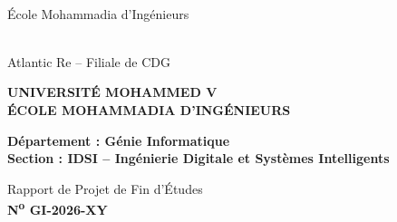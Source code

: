 \documentclass[12pt,a4paper]{report}
\begin{document}

\setcounter{page}{1}

\begin{titlepage}
\thispagestyle{empty}
\begin{center}

\begin{minipage}[c]{0.35\textwidth}
  \centering
  \\[0.3cm]
  {\small École Mohammadia d'Ingénieurs}
\end{minipage}
\hfill
\begin{minipage}[c]{0.35\textwidth}
  \centering
  \\[0.3cm]
  {\small Atlantic Re -- Filiale de CDG}
\end{minipage}

\vspace{1.2cm}
{\large \textbf{UNIVERSITÉ MOHAMMED V}}\\[0.1cm]
{\large \textbf{ÉCOLE MOHAMMADIA D'INGÉNIEURS}}

\vspace{0.5cm}
\hrulefill
\vspace{0.3cm}

{\normalsize \textbf{Département : Génie Informatique}}\\[0.1cm]
{\normalsize \textbf{Section : IDSI -- Ingénierie Digitale et Systèmes Intelligents}}
\vspace{1.2cm}

{\normalsize Rapport de Projet de Fin d'Études}\\[0.1cm]
{\normalsize \textbf{N\textsuperscript{o} GI-2026-XY}}
\vspace{0.6cm}

\setlength{\fboxsep}{12pt}

\vfill


\end{center}
\end{titlepage}
\end{document}
